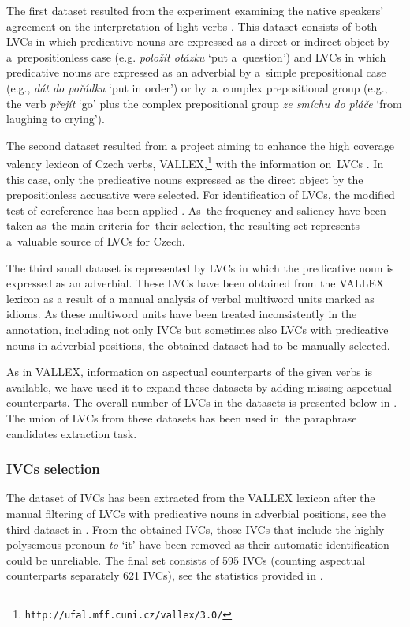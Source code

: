\documentclass[output=paper
,modfonts
,nonflat]{langsci/langscibook}
\begin{document}
The first dataset resulted from the experiment examining the native speakers’ 
agreement on the interpretation of light verbs \citep{KeLoCorpusBased2013}. 
This dataset consists of both LVCs in which predicative nouns are expressed as 
a direct or indirect object by a~prepositionless case (e.g. \textit{položit 
otázku} `put a~question') and LVCs in which predicative nouns are expressed 
as an adverbial by a~simple prepositional case (e.g., \textit{dát do pořádku} 
`put in order') or by~a~complex prepositional group (e.g., the verb 
\textit{přejít}  `go' plus the complex prepositional group 
\textit{ze smíchu do pláče} `from laughing to crying'). 

The second dataset resulted from a project aiming to enhance the high coverage
valency lexicon of Czech verbs, VALLEX,\footnote{\texttt{http://ufal.mff.cuni.cz/vallex/3.0/}} 
with the information on~LVCs \citep{KeBaLoLexicographicDescription2016}. 
In this case, only the predicative nouns expressed as the direct object by the 
prepositionless accusative were selected. For identification of LVCs, the 
modified test of coreference has been applied \citep{kettnerova-bejcek-2016}. As~the 
frequency and saliency have been taken as~the main criteria for~their 
selection, the resulting set represents a~valuable source of LVCs for Czech. 

The third small dataset is represented by LVCs in which the predicative noun is 
expressed as an adverbial. These LVCs have been obtained from the VALLEX lexicon 
as a result of a manual analysis of verbal multiword units marked as idioms. As 
these multiword units have been treated inconsistently in the annotation, 
including not only IVCs but sometimes also LVCs with predicative nouns in 
adverbial positions, the obtained dataset had to be manually selected.

As in VALLEX, information on aspectual counterparts of the given verbs is 
available, we have used it to expand these datasets by adding missing aspectual 
counterparts. The overall number of LVCs in the datasets is presented below in 
. The union of LVCs from these datasets has been used in~the 
paraphrase candidates extraction task.

\subsubsection{IVCs selection}
The dataset of IVCs has been extracted from the VALLEX lexicon after the manual
filtering of LVCs with predicative nouns in adverbial positions, see the third
dataset in . From the obtained IVCs, those IVCs 
that include the highly polysemous pronoun \textit{to} `it' have been removed 
as their automatic identification could be unreliable. The final set consists of 
595 IVCs (counting aspectual counterparts separately 621 IVCs), see the 
statistics provided in . 
\end{document}
